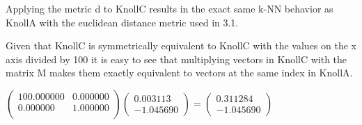 Applying the metric d to KnollC results in the exact same k-NN behavior as KnollA with the euclidean distance metric used in 3.1.

Given that KnollC is symmetrically equivalent to KnollC with the values on the x axis divided by 100 it is easy to see that multiplying vectors in KnollC with the matrix M makes them exactly equivalent to vectors at the same index in KnollA.

$\begin{pmatrix}
 100.000000 & 0.000000 \\
 0.000000 & 1.000000 \\
\end{pmatrix}
 \begin{pmatrix}
 0.003113  \\
 -1.045690
\end{pmatrix}
= \begin{pmatrix}
 0.311284  \\ 
-1.045690
\end{pmatrix}
$